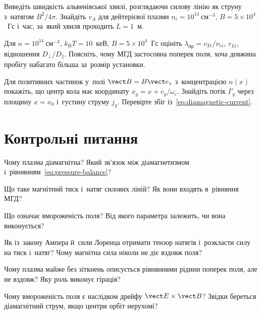\begin{problem}\label{prb:new-alfven-string}
	Виведіть швидкість альвенівської хвилі, розглядаючи силову лінію як струну з~натягом
	$B^2/4\pi$. Знайдіть $v_A$ для дейтерієвої плазми $n_i=10^{14}~\mathrm{см}^{-3}$,
	$B=5\times10^4$~Гс і~час, за~який хвиля проходить $L=1$~м.
\end{problem}

\begin{problem}\label{prb:new-fluid}
	Для $n=10^{14}~\mathrm{см}^{-3}$, $k_{\mathrm B}T=10$~кеВ, $B=5\times10^4$~Гс оцініть
	$\lambda_{\mathrm{пр}}=v_{Te}/\nu_{ei}$, $r_{Li}$, відношення $D_\perp/D_\parallel$.
	Поясніть, чому МГД застосовна поперек поля, хоча довжина пробігу набагато більша
	за~розмір установки.
\end{problem}

\begin{problem}\label{prb:new-dia-flux}
	Для позитивних частинок у~полі $\vect B=B\vect e_z$ з~концентрацією $n(x)$ покажіть,
	що центр кола має координату $x_g=x+v_y/\omega_c$. Знайдіть потік $\Gamma_y$ через
	площину $x=x_0$ і~густину струму $j_y$. Перевірте збіг
	із~\eqref{eq:diamagnetic-current}.
\end{problem}

\section*{Контрольні питання}

\begin{Questions}
\begin{quizlist}
\item Чому плазма діамагнітна? Який зв'язок між діамагнетизмом
		  і~рівнянням~\eqref{eq:pressure-balance}?

\item Що таке магнітний тиск і~натяг силових ліній? Як вони входять в~рівняння
		  МГД?

\item Що означає вмороженість поля? Від якого параметра залежить, чи вона
		  виконується?

\item Як із~закону Ампера й~сили Лоренца отримати тензор натягів і~розкласти силу
		  на тиск і~натяг? Чому магнітна сила ніколи не діє вздовж поля?

\item Чому плазма майже без зіткнень описується рівняннями рідини поперек поля,
		  але не вздовж? Яку роль виконує гірація?

\item Чому вмороженість поля є наслідком дрейфу $\vect E\times\vect B$? Звідки
		  береться діамагнітний струм, якщо центри орбіт нерухомі?

\end{quizlist}
\end{Questions}

